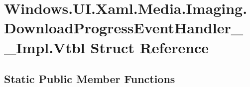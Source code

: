 \hypertarget{struct_windows_1_1_u_i_1_1_xaml_1_1_media_1_1_imaging_1_1_download_progress_event_handler_____impl_1_1_vtbl}{}\section{Windows.\+U\+I.\+Xaml.\+Media.\+Imaging.\+Download\+Progress\+Event\+Handler\+\_\+\+\_\+\+Impl.\+Vtbl Struct Reference}
\label{struct_windows_1_1_u_i_1_1_xaml_1_1_media_1_1_imaging_1_1_download_progress_event_handler_____impl_1_1_vtbl}
\subsection*{Static Public Member Functions}

